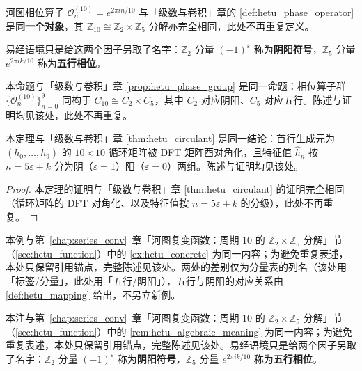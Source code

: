 \begin{remark}\label{def:hetu_phase_operator_yijing}
河图相位算子 $\mathcal{O}_n^{(10)} = e^{2\pi i n / 10}$ 与「级数与卷积」章的 \cref{def:hetu_phase_operator} 是\textbf{同一个对象}，其 $\mathbb{Z}_{10} \cong \mathbb{Z}_2 \times \mathbb{Z}_5$ 分解亦完全相同，此处不再重复定义。

易经语境只是给这两个因子另取了名字：$\mathbb{Z}_2$ 分量 $(-1)^{\varepsilon}$ 称为\textbf{阴阳符号}，$\mathbb{Z}_5$ 分量 $e^{2\pi i k / 10}$ 称为\textbf{五行相位}。
\end{remark}

\begin{remark}[河图相位算子群的直积分解（重述）]\label{prop:hetu_phase_group_yijing}
本命题与「级数与卷积」章 \cref{prop:hetu_phase_group} 是同一命题：相位算子群 $\{\mathcal{O}_n^{(10)}\}_{n=0}^{9}$ 同构于 $C_{10} \cong C_2 \times C_5$，其中 $C_2$ 对应阴阳、$C_5$ 对应五行。陈述与证明均见该处，此处不再重复。
\end{remark}

\begin{remark}\label{thm:hetu_circulant_yijing}
本定理与「级数与卷积」章 \cref{thm:hetu_circulant} 是同一结论：首行生成元为 $(h_0,\dots,h_9)$ 的 $10\times 10$ 循环矩阵被 DFT 矩阵酉对角化，且特征值 $\hat h_n$ 按 $n = 5\varepsilon + k$ 分为阴（$\varepsilon=1$）阳（$\varepsilon=0$）两组。陈述与证明均见该处。
\end{remark}

\begin{proof}
本定理的证明与「级数与卷积」章 \cref{thm:hetu_circulant} 的证明完全相同（循环矩阵的 DFT 对角化、以及特征值按 $n = 5\varepsilon + k$ 的分级），此处不再重复。
\end{proof}

\begin{example}[河图复变函数的具体分解]\label{ex:hetu_concrete_yijing}
本例与第~\ref{chap:series_conv}~章「河图复变函数：周期 $10$ 的 $\mathbb{Z}_2\times\mathbb{Z}_5$ 分解」节（\cref{sec:hetu_function}）中的 \cref{ex:hetu_concrete} 为同一内容；为避免重复表述，本处只保留引用锚点，完整陈述见该处。两处的差别仅为分量表的列名（该处用「标签/分量」，此处用「五行/阴阳」），五行与阴阳的对应关系由 \cref{def:hetu_mapping} 给出，不另立新例。
\end{example}

\begin{remark}[河图结构的代数意义]
本注与第~\ref{chap:series_conv}~章「河图复变函数：周期 $10$ 的 $\mathbb{Z}_2\times\mathbb{Z}_5$ 分解」节（\cref{sec:hetu_function}）中的 \cref{rem:hetu_algebraic_meaning} 为同一内容；为避免重复表述，本处只保留引用锚点，完整陈述见该处。易经语境只是给两个因子另取了名字：$\mathbb{Z}_2$ 分量 $(-1)^{\varepsilon}$ 称为\textbf{阴阳符号}，$\mathbb{Z}_5$ 分量 $e^{2\pi i k/10}$ 称为\textbf{五行相位}。
\end{remark}

